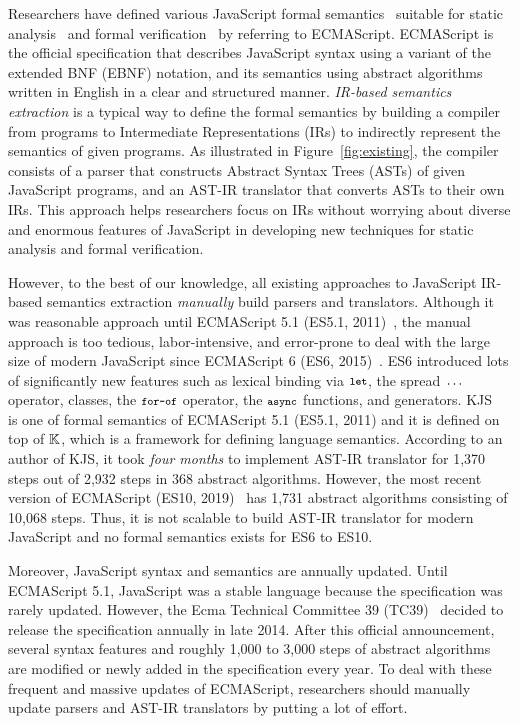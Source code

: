 Researchers have defined various JavaScript formal
semantics~\cite{aplas08,lambdajs,kjs,javert} suitable for static
analysis~\cite{jsai,tajs,wala,safe} and formal verification~\cite{javert} by
referring to ECMAScript.  ECMAScript is the official specification that
describes JavaScript syntax using a variant of the extended BNF (EBNF) notation,
and its semantics using abstract algorithms written in English in a clear and
structured manner.  \textit{IR-based semantics extraction} is a typical way to
define the formal semantics by building a compiler from programs to Intermediate
Representations (IRs) to indirectly represent the semantics of given programs.
As illustrated in Figure~\ref{fig:existing}, the compiler consists of a parser
that constructs Abstract Syntax Trees (ASTs) of given JavaScript programs, and
an AST-IR translator that converts ASTs to their own IRs.  This approach helps
researchers focus on IRs without worrying about diverse and enormous features of
JavaScript in developing new techniques for static analysis and formal
verification.

However, to the best of our knowledge, all existing approaches to JavaScript
IR-based semantics extraction \textit{manually} build parsers and translators.
Although it was reasonable approach until ECMAScript 5.1 (ES5.1,
2011)~\cite{es5}, the manual approach is too tedious, labor-intensive, and
error-prone to deal with the large size of modern JavaScript since ECMAScript 6
(ES6, 2015)~\cite{es6}. ES6 introduced lots of significantly new features such
as lexical binding via \( \texttt{\footnotesize let} \), the spread \( \texttt{\footnotesize...} \) operator,
classes, the \( \texttt{\footnotesize for-of} \) operator, the \( \texttt{\footnotesize async} \) functions, and
generators.  KJS~\cite{kjs} is one of formal semantics of ECMAScript 5.1 (ES5.1,
2011) and it is defined on top of \( \mathbb{K} \), which is a framework for
defining language semantics.  According to an author of KJS, it took
\textit{four months} to implement AST-IR translator for 1,370 steps out of 2,932
steps in 368 abstract algorithms. However, the most recent version of ECMAScript
(ES10, 2019)~\cite{es10} has 1,731 abstract algorithms consisting of 10,068
steps. Thus, it is not scalable to build AST-IR translator for modern JavaScript
and no formal semantics exists for ES6 to ES10.

Moreover, JavaScript syntax and semantics are annually updated.  Until
ECMAScript 5.1, JavaScript was a stable language because the specification was
rarely updated.  However, the Ecma Technical Committee 39 (TC39)~\cite{tc39}
decided to release the specification annually in late 2014.  After this official
announcement, several syntax features and roughly 1,000 to 3,000 steps of
abstract algorithms are modified or newly added in the specification every year.
To deal with these frequent and massive updates of ECMAScript, researchers
should manually update parsers and AST-IR translators by putting a lot of
effort.

